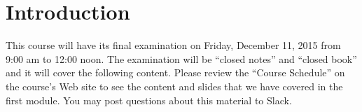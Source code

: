 


\section*{Introduction}

This course will have its final examination on Friday, December 11, 2015 from 9:00 am to 12:00 noon. The examination will
be ``closed notes'' and ``closed book'' and it will cover the following content. Please review the ``Course Schedule''
on the course's Web site to see the content and slides that we have covered in the first module. You may post questions
about this material to Slack.

